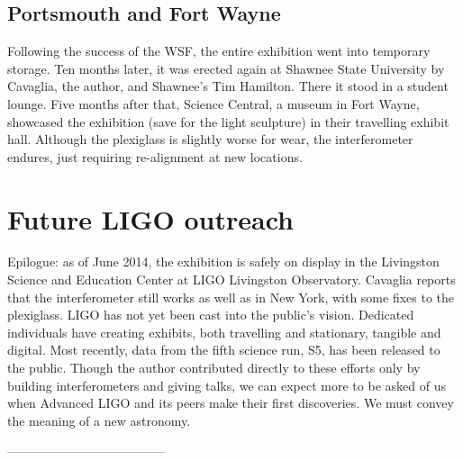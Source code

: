         \subsection{Portsmouth and Fort Wayne}
        \label{secondary_installations}


Following the success of the WSF, the entire exhibition went into temporary storage.
Ten months later, it was erected again at Shawnee State University by Cavaglia, the author, and Shawnee's Tim Hamilton.
There it stood in a student lounge.
Five months after that, Science Central, a museum in Fort Wayne, showcased the exhibition (save for the light sculpture) in their travelling exhibit hall.
Although the plexiglass is slightly worse for wear, the interferometer endures, just requiring re-alignment at new locations.


    \section{Future LIGO outreach}
    \label{future_outreach}

        Epilogue: as of June 2014, the exhibition is safely on display in the Livingston Science and Education Center at LIGO Livingston Observatory.
Cavaglia reports that the interferometer still works as well as in New York, with some fixes to the plexiglass.
LIGO has not yet been cast into the public's vision.
Dedicated individuals have creating exhibits, both travelling and stationary, tangible and digital.
Most recently, data from the fifth science run, S5, has been released to the public.
Though the author contributed directly to these efforts only by building interferometers and giving talks, we can expect more to be asked of us when Advanced LIGO and its peers make their first discoveries.
We must convey the meaning of a new astronomy.



        --------------------------------------




